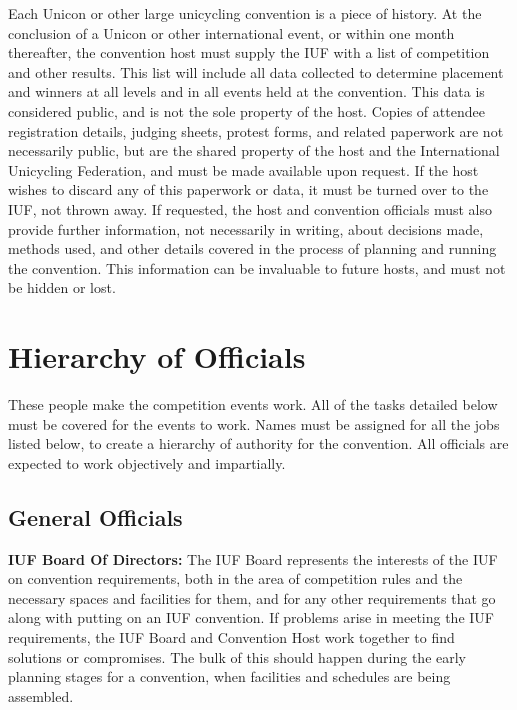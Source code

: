 Each Unicon or other large unicycling convention is a piece of history.
At the conclusion of a Unicon or other international event, or within one month thereafter, the convention host must supply the IUF with a list of competition and other results.
This list will include all data collected to determine placement and winners at all levels and in all events held at the convention.
This data is considered public, and is not the sole property of the host.
Copies of attendee registration details, judging sheets, protest forms, and related paperwork are not necessarily public, but are the shared property of the host and the International Unicycling Federation, and must be made available upon request.
If the host wishes to discard any of this paperwork or data, it must be turned over to the IUF, not thrown away.
If requested, the host and convention officials must also provide further information, not necessarily in writing, about decisions made, methods used, and other details covered in the process of planning and running the convention.
This information can be invaluable to future hosts, and must not be hidden or lost.

\section{Hierarchy of Officials}

These people make the competition events work.
All of the tasks detailed below must be covered for the events to work.
Names must be assigned for all the jobs listed below, to create a hierarchy of authority for the convention.
All officials are expected to work objectively and impartially.

\subsection{General Officials}

\textbf{IUF Board Of Directors:} The IUF Board represents the interests of the IUF on convention requirements, both in the area of competition rules and the necessary spaces and facilities for them, and for any other requirements that go along with putting on an IUF convention.
If problems arise in meeting the IUF requirements, the IUF Board and Convention Host work together to find solutions or compromises.
The bulk of this should happen during the early planning stages for a convention, when facilities and schedules are being assembled.

